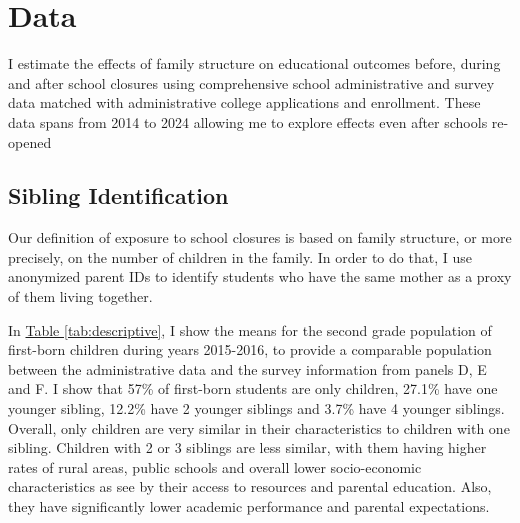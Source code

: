 \section{Data}\label{sec:data}
I estimate the effects of family structure on educational outcomes before, during and after school closures using comprehensive school administrative and survey data matched with administrative college applications and enrollment. These data spans from 2014 to 2024 allowing me to explore effects even after schools re-opened

\subsection{Sibling Identification}

Our definition of exposure to school closures is based on family structure, or more precisely, on the number of children in the family. In order to do that, I use anonymized parent IDs to identify students who have the same mother as a proxy of them living together. %

In \hyperref[tab:descriptive]{Table \ref{tab:descriptive}}, I show the means for the second grade population of first-born children during years 2015-2016, to provide a comparable population between the administrative data and the survey information from panels D, E and F. I show that 57\% of first-born students are only children, 27.1\% have one younger sibling, 12.2\% have 2 younger siblings and 3.7\% have 4 younger siblings. Overall, only children are very similar in their characteristics to children with one sibling. Children with 2 or 3 siblings are less similar, with them having higher rates of rural areas, public schools and overall lower socio-economic characteristics as see by their access to resources and parental education. Also, they have significantly lower academic performance and parental expectations.


